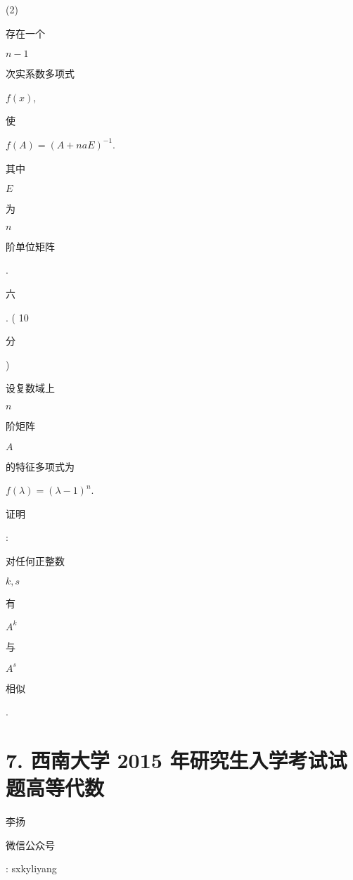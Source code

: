 \documentclass[10pt]{article}
\begin{document}
(2) \begin{CJK}{UTF8}{mj}存在一个\end{CJK} $n-1$ \begin{CJK}{UTF8}{mj}次实系数多项式\end{CJK} $f(x)$, \begin{CJK}{UTF8}{mj}使\end{CJK} $f(A)=(A+n a E)^{-1}$. \begin{CJK}{UTF8}{mj}其中\end{CJK} $E$ \begin{CJK}{UTF8}{mj}为\end{CJK} $n$ \begin{CJK}{UTF8}{mj}阶单位矩阵\end{CJK}.

\begin{CJK}{UTF8}{mj}六\end{CJK}. ( 10 \begin{CJK}{UTF8}{mj}分\end{CJK}) \begin{CJK}{UTF8}{mj}设复数域上\end{CJK} $n$ \begin{CJK}{UTF8}{mj}阶矩阵\end{CJK} $A$ \begin{CJK}{UTF8}{mj}的特征多项式为\end{CJK} $f(\lambda)=(\lambda-1)^{n}$. \begin{CJK}{UTF8}{mj}证明\end{CJK}: \begin{CJK}{UTF8}{mj}对任何正整数\end{CJK} $k, s$ \begin{CJK}{UTF8}{mj}有\end{CJK} $A^{k}$ \begin{CJK}{UTF8}{mj}与\end{CJK} $A^{s}$ \begin{CJK}{UTF8}{mj}相似\end{CJK}.

\section{7. 西南大学 2015 年研究生入学考试试题高等代数}
\begin{CJK}{UTF8}{mj}李扬\end{CJK}

\begin{CJK}{UTF8}{mj}微信公众号\end{CJK}: sxkyliyang
\end{document}
